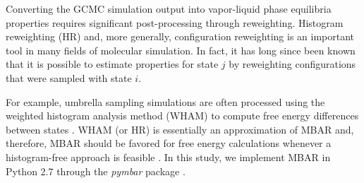 \documentclass[journal=jced,manuscript=article]{achemso}
\begin{document}
%




Converting the GCMC simulation output into vapor-liquid phase equilibria properties requires significant post-processing through reweighting. Histogram reweighting (HR) and, more generally, configuration reweighting is an important tool in many fields of molecular simulation. In fact, it has long since been known that it is possible to estimate properties for state $j$ by reweighting configurations that were sampled with state $i$. \cite{McDonald1967,Card1970,Wood1968,Pana2000} 

For example, umbrella sampling simulations are often processed using the weighted histogram analysis method (WHAM) to compute free energy differences between states \cite{Kumar1992}. WHAM (or HR) is essentially an approximation of MBAR and, therefore, MBAR should be favored for free energy calculations whenever a histogram-free approach is feasible \cite{Matos2017}. In this study, we implement MBAR in Python 2.7 through the \textit{pymbar} package \cite{pymbar}. 
\end{document}
